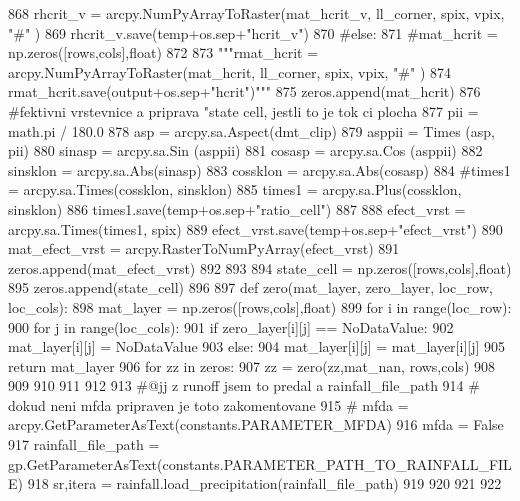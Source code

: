 \begin{DoxyCode}
868   rhcrit\_v = arcpy.NumPyArrayToRaster(mat\_hcrit\_v, ll\_corner, spix, vpix, \textcolor{stringliteral}{"#"} )
869   rhcrit\_v.save(temp+os.sep+\textcolor{stringliteral}{"hcrit\_v"})
870   \textcolor{comment}{#else:
}
871       \textcolor{comment}{#mat\_hcrit = np.zeros([rows,cols],float)
}
872 
873   \textcolor{stringliteral}{"""rmat\_hcrit = arcpy.NumPyArrayToRaster(mat\_hcrit, ll\_corner, spix, vpix, "#" )
}
874 \textcolor{stringliteral}{  rmat\_hcrit.save(output+os.sep+"hcrit")"""}
875   zeros.append(mat\_hcrit)
876   \textcolor{comment}{#fektivni vrstevnice a priprava "state cell, jestli to je tok ci plocha
}
877   pii = math.pi / 180.0
878   asp = arcpy.sa.Aspect(dmt\_clip)
879   asppii = Times (asp, pii)
880   sinasp = arcpy.sa.Sin (asppii)
881   cosasp = arcpy.sa.Cos (asppii)
882   sinsklon = arcpy.sa.Abs(sinasp)
883   cossklon = arcpy.sa.Abs(cosasp)
884   \textcolor{comment}{#times1 = arcpy.sa.Times(cossklon, sinsklon)
}
885   times1 = arcpy.sa.Plus(cossklon, sinsklon)
886   times1.save(temp+os.sep+\textcolor{stringliteral}{"ratio\_cell"})
887 
888   efect\_vrst = arcpy.sa.Times(times1, spix)
889   efect\_vrst.save(temp+os.sep+\textcolor{stringliteral}{"efect\_vrst"})
890   mat\_efect\_vrst = arcpy.RasterToNumPyArray(efect\_vrst)
891   zeros.append(mat\_efect\_vrst)
892 
893 
894   state\_cell = np.zeros([rows,cols],float)
895   zeros.append(state\_cell)
896 
897   \textcolor{keyword}{def }zero(mat\_layer, zero\_layer, loc\_row, loc\_cols):
898       mat\_layer = np.zeros([rows,cols],float)
899       \textcolor{keywordflow}{for} i \textcolor{keywordflow}{in} range(loc\_row):
900         \textcolor{keywordflow}{for} j \textcolor{keywordflow}{in} range(loc\_cols):
901             \textcolor{keywordflow}{if} zero\_layer[i][j] == NoDataValue:
902               mat\_layer[i][j] = NoDataValue
903             \textcolor{keywordflow}{else}:
904               mat\_layer[i][j] = mat\_layer[i][j]
905       \textcolor{keywordflow}{return} mat\_layer
906   \textcolor{keywordflow}{for} zz \textcolor{keywordflow}{in} zeros:
907       zz = zero(zz,mat\_nan, rows,cols)
908 
909 
910 
911 
912 
913   \textcolor{comment}{#@jj z runoff jsem to predal a rainfall\_file\_path
}
914   \textcolor{comment}{# dokud neni mfda pripraven je toto zakomentovane
}
915   \textcolor{comment}{# mfda = arcpy.GetParameterAsText(constants.PARAMETER\_MFDA)
}
916   mfda   = \textcolor{keyword}{False}
917   rainfall\_file\_path = gp.GetParameterAsText(constants.PARAMETER\_PATH\_TO\_RAINFALL\_FILE)
918   sr,itera  = rainfall.load\_precipitation(rainfall\_file\_path)
919 
920 
921 
922 

\end{DoxyCode}

